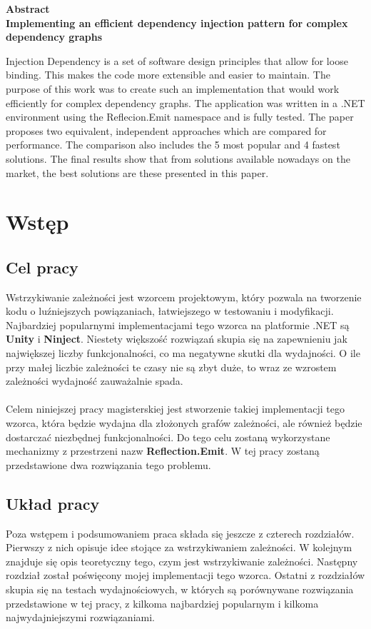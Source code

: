 \documentclass[12pt]{article}
\begin{document}
\clearpage
\begin{center}
\textbf{Abstract}\\
\vspace{16pt}
\textbf{Implementing an efficient dependency injection pattern for complex dependency graphs}
\end{center}
Injection Dependency is a set of software design principles that allow for loose binding. This makes the code more extensible and easier to maintain. The purpose of this work was to create such an implementation that would work efficiently for complex dependency graphs. The application was written in a .NET environment using the Reflecion.Emit namespace and is fully tested. The paper proposes two equivalent, independent approaches which are compared for performance. The comparison also includes the 5 most popular and 4 fastest solutions. The final results show that from solutions available nowadays on the market, the best solutions are these presented in this paper.


\clearpage
\tableofcontents


\clearpage
\section{Wstęp}
\subsection{Cel pracy}
Wstrzykiwanie zależności jest wzorcem projektowym, który pozwala na tworzenie kodu o luźniejszych powiązaniach, łatwiejszego w testowaniu i modyfikacji. Najbardziej popularnymi implementacjami tego wzorca na platformie .NET są \textbf{Unity} i \textbf{Ninject}. Niestety większość rozwiązań skupia się na zapewnieniu jak największej liczby funkcjonalności, co ma negatywne skutki dla wydajności. O ile przy małej liczbie zależności te czasy nie są zbyt duże, to wraz ze wzrostem zależności wydajność zauważalnie spada.\\
\\
Celem niniejszej pracy magisterskiej jest stworzenie takiej implementacji tego wzorca, która będzie wydajna dla złożonych grafów zależności, ale również będzie dostarczać niezbędnej funkcjonalności. Do tego celu zostaną wykorzystane mechanizmy z przestrzeni nazw \textbf{Reflection.Emit}. W tej pracy zostaną przedstawione dwa rozwiązania tego problemu.

\subsection{Układ pracy}
Poza wstępem i podsumowaniem praca składa się jeszcze z czterech rozdziałów. Pierwszy z nich opisuje idee stojące za wstrzykiwaniem zależności. W kolejnym znajduje się opis teoretyczny tego, czym jest wstrzykiwanie zależności. Następny rozdział został poświęcony mojej implementacji tego wzorca. Ostatni z rozdziałów skupia się na testach wydajnościowych, w których są porównywane rozwiązania przedstawione w tej pracy, z kilkoma najbardziej popularnym i kilkoma najwydajniejszymi rozwiązaniami.
\end{document}
